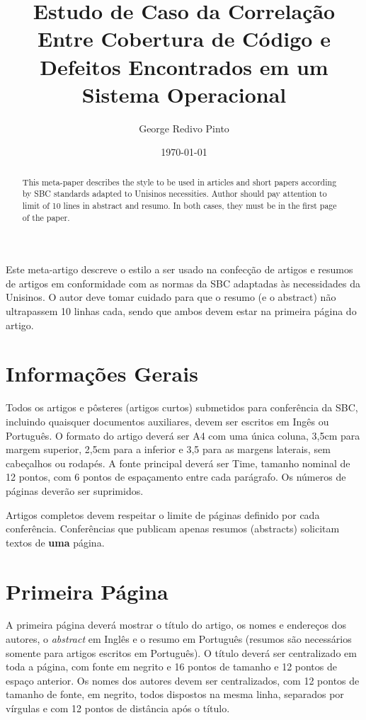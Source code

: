 \documentclass[11.5pt]{article}
\date{\today}
\title{
    Estudo de Caso da Correlação Entre Cobertura de Código e Defeitos Encontrados em um Sistema
    Operacional
}
\author{George Redivo Pinto}
\begin{document}
\imprimircapa
\imprimirfolhaderosto

\maketitle

\begin{abstract}

This meta-paper describes the style to be used in articles and short papers according by SBC
standards adapted to Unisinos necessities. Author should pay attention to limit of 10 lines in
abstract and resumo. In both cases, they must be in the first page of the paper.

\end{abstract}

\begin{resumo}

Este meta-artigo descreve o estilo a ser usado na confecção de artigos e resumos de artigos em
conformidade com as normas da SBC adaptadas às necessidades da Unisinos. O autor deve tomar cuidado
para que o resumo (e o abstract) não ultrapassem 10 linhas cada, sendo que ambos devem estar na
primeira página do artigo.

\end{resumo}


\section{Informações Gerais}


Todos os artigos e pôsteres (artigos curtos) submetidos para conferência da SBC, incluindo quaisquer documentos auxiliares, devem ser escritos em Ingês ou Português. O formato do artigo deverá ser A4 com uma única coluna, 3,5cm para margem superior,  2,5cm para a inferior e 3,5 para as margens laterais, sem cabeçalhos ou rodapés. A fonte principal deverá ser Time, tamanho nominal de 12 pontos, com 6 pontos de espaçamento entre cada parágrafo. Os números de páginas deverão ser suprimidos.

Artigos completos devem respeitar o limite de páginas definido por cada conferência. Conferências que publicam apenas resumos (abstracts) solicitam textos de \textbf{uma} página.

\section{Primeira Página} \label{sec:firstpage}

A primeira página deverá mostrar o título do artigo, os nomes e endereços dos autores, o \emph{abstract} em Inglês e o resumo em Português (resumos são necessários somente para artigos escritos em Português). O título deverá ser centralizado em toda a página, com fonte em negrito e 16 pontos de tamanho e 12 pontos de espaço anterior. Os nomes dos autores devem ser centralizados, com 12 pontos de tamanho de fonte, em negrito, todos dispostos na mesma linha, separados por vírgulas e com 12 pontos de distância após o título. 
\end{document}
